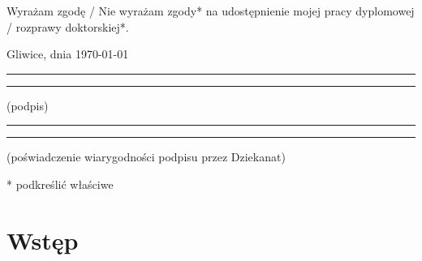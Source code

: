 \documentclass[a4paper, 12pt, twoside]{article}
\begin{document}
\vfill

Wyrażam  zgodę / Nie wyrażam zgody*  na  udostępnienie  mojej  pracy  dyplomowej / rozprawy doktorskiej*.

\vfill

Gliwice, dnia \today

\vfill

\rule{0.5\textwidth}{0cm}\dotfill

\rule{0.5\textwidth}{0cm}
\begin{minipage}{0.45\textwidth}
      {\begin{center}(podpis)\end{center}}
\end{minipage}

\vfill

\rule{0.5\textwidth}{0cm}\dotfill

\rule{0.5\textwidth}{0cm}
\begin{minipage}{0.45\textwidth}
      {\begin{center}\rule{0mm}{5mm}(poświadczenie wiarygodności podpisu przez Dziekanat)\end{center}}
\end{minipage}


\vfill

* podkreślić właściwe


\cleardoublepage

\newcommand{\rightorleftmark}{%
      \begingroup\protected@edef\x{\rightmark}%
      \ifx\x\@empty
            \endgroup\leftmark
      \else
            \endgroup\rightmark
      \fi}
\makeatother

\pagestyle{NumeryStronNazwyRozdzialow}

\tableofcontents

\newpage
\section{Wstęp}\label{intro}
\end{document}
